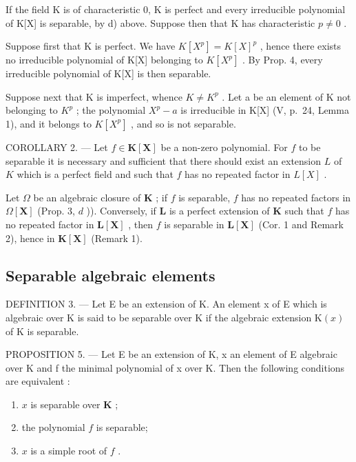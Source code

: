 If the field K is of characteristic 0, K is perfect and every irreducible polynomial of K{[}X{]} is separable, by d) above. Suppose then that K has characteristic \(p \neq 0\) .

Suppose first that K is perfect. We have \(K[X^{p}] = K[X]^{p}\) , hence there exists no irreducible polynomial of K{[}X{]} belonging to \(K[X^{p}]\) . By Prop. 4, every irreducible polynomial of K{[}X{]} is then separable.

Suppose next that K is imperfect, whence \(K \neq K^{p}\) . Let a be an element of K not belonging to \(K^{p}\) ; the polynomial \(X^{p} - a\) is irreducible in K{[}X{]} (V, p.~24, Lemma 1), and it belongs to \(K[X^{p}]\) , and so is not separable.

COROLLARY 2. --- Let \(f \in \mathbf{K}[\mathbf{X}]\) be a non-zero polynomial. For \(f\) to be separable it is necessary and sufficient that there should exist an extension \(L\) of \(K\) which is a perfect field and such that \(f\) has no repeated factor in \(L[X]\) .

Let \(\Omega\) be an algebraic closure of \(\mathbf{K}\) ; if \(f\) is separable, \(f\) has no repeated factors in \(\Omega[\mathbf{X}]\) (Prop. 3, \(d\) )). Conversely, if \(\mathbf{L}\) is a perfect extension of \(\mathbf{K}\) such that \(f\) has no repeated factor in \(\mathbf{L}[\mathbf{X}]\) , then \(f\) is separable in \(\mathbf{L}[\mathbf{X}]\) (Cor. 1 and Remark 2), hence in \(\mathbf{K}[\mathbf{X}]\) (Remark 1).

\subsection{Separable algebraic elements}

DEFINITION 3. --- Let E be an extension of K. An element x of E which is algebraic over K is said to be separable over K if the algebraic extension \(\mathrm{K}(x)\) of K is separable.

PROPOSITION 5. --- Let E be an extension of K, x an element of E algebraic over K and f the minimal polynomial of x over K. Then the following conditions are equivalent :

\begin{enumerate}
\def\labelenumi{\alph{enumi})}
\item
  \(x\) is separable over \(\mathbf{K}\) ;
\item
  the polynomial \(f\) is separable;
\item
  \(x\) is a simple root of \(f\) .
\end{enumerate}

